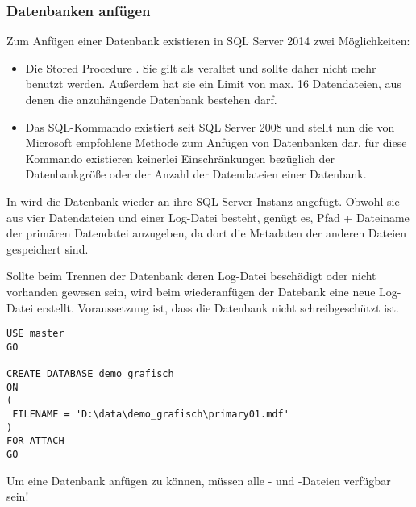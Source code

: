         \subsubsection{Datenbanken anfügen}
          Zum Anfügen einer Datenbank existieren in SQL Server 2014 zwei
          Möglichkeiten:
          \begin{itemize}
              \item Die Stored Procedure . Sie
              gilt als veraltet und sollte daher nicht mehr benutzt werden.
              Außerdem hat sie ein Limit von max. 16 Datendateien, aus denen die
              anzuhängende Datenbank bestehen darf.
              \item Das SQL-Kommando  existiert seit SQL Server 2008 und stellt nun die von
              Microsoft empfohlene Methode zum Anfügen von Datenbanken dar. f\"ur
              diese Kommando existieren keinerlei Einschränkungen bezüglich der
              Datenbankgröße oder der Anzahl der Datendateien einer Datenbank.
          \end{itemize}
          In  wird die Datenbank
           wieder an ihre SQL Server-Instanz
          angefügt. Obwohl sie aus vier Datendateien und einer Log-Datei
          besteht, genügt es, Pfad + Dateiname der primären Datendatei
          anzugeben, da dort die Metadaten der anderen Dateien gespeichert sind.
          \begin{merke}
            Sollte beim Trennen der Datenbank deren Log-Datei beschädigt oder
            nicht vorhanden gewesen sein, wird beim wiederanfügen der Datebank
            eine neue Log-Datei erstellt. Voraussetzung ist, dass die Datenbank
            nicht schreibgeschützt ist.
          \end{merke}
\clearpage
          \begin{lstlisting}[language=ms_sql,caption={Anfügen der Datenbank
          demo\_grafisch},label=admin03_21]
USE master 
GO

CREATE DATABASE demo_grafisch
ON 
(
 FILENAME = 'D:\data\demo_grafisch\primary01.mdf'
)
FOR ATTACH
GO
          \end{lstlisting}
          \begin{merke}
            Um eine Datenbank anfügen zu können, müssen alle -
            und -Dateien verfügbar sein!
          \end{merke}
